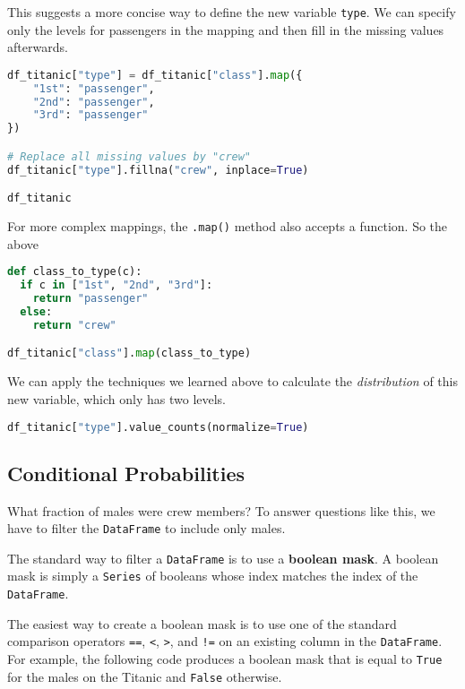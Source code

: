This suggests a more concise way to define the new variable \verb|type|. We can specify only the levels for passengers in the mapping and then fill in the missing values afterwards.

\begin{lstlisting}[language=Python]
df_titanic["type"] = df_titanic["class"].map({
    "1st": "passenger",
    "2nd": "passenger",
    "3rd": "passenger"
})

# Replace all missing values by "crew"
df_titanic["type"].fillna("crew", inplace=True)

df_titanic
\end{lstlisting}




For more complex mappings, the \verb|.map()| method also accepts a function. So the above

\begin{lstlisting}[language=Python]
def class_to_type(c):
  if c in ["1st", "2nd", "3rd"]:
    return "passenger"
  else:
    return "crew"

df_titanic["class"].map(class_to_type)
\end{lstlisting}




We can apply the techniques we learned above to calculate the \textit{distribution} of this new variable, which only has two levels.

\begin{lstlisting}[language=Python]
df_titanic["type"].value_counts(normalize=True)
\end{lstlisting}




\subsection{Conditional Probabilities}\label{2.1.2}

What fraction of males were crew members? To answer questions like this, we have to filter the \verb|DataFrame| to include only males.

The standard way to filter a \verb|DataFrame| is to use a \textbf{boolean mask}. A boolean mask is simply a \verb|Series| of booleans whose index matches the index of the \verb|DataFrame|.

The easiest way to create a boolean mask is to use one of the standard comparison operators \verb|==|, \verb|<|, \verb|>|, and \verb|!=| on an existing column in the \verb|DataFrame|. For example, the following code produces a boolean mask that is equal to \verb|True| for the males on the Titanic and \verb|False| otherwise.

